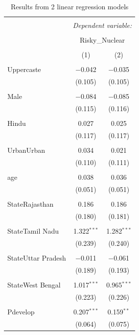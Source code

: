 \documentclass[
]{article}
\begin{document}
\begin{table}[!htbp] \centering 
  \caption{Results from 2 linear regression models} 
  \label{} 
\begin{tabular}{@{\extracolsep{5pt}}lcc} 
\\[-1.8ex]\hline 
\hline \\[-1.8ex] 
 & \multicolumn{2}{c}{\textit{Dependent variable:}} \\ 
\cline{2-3} 
\\[-1.8ex] & \multicolumn{2}{c}{Risky\_Nuclear} \\ 
\\[-1.8ex] & (1) & (2)\\ 
\hline \\[-1.8ex] 
 Uppercaste & $-$0.042 & $-$0.035 \\ 
  & (0.105) & (0.105) \\ 
  & & \\ 
 Male & $-$0.084 & $-$0.085 \\ 
  & (0.115) & (0.116) \\ 
  & & \\ 
 Hindu & 0.027 & 0.025 \\ 
  & (0.117) & (0.117) \\ 
  & & \\ 
 UrbanUrban & 0.034 & 0.021 \\ 
  & (0.110) & (0.111) \\ 
  & & \\ 
 age & 0.038 & 0.036 \\ 
  & (0.051) & (0.051) \\ 
  & & \\ 
 StateRajasthan & 0.186 & 0.186 \\ 
  & (0.180) & (0.181) \\ 
  & & \\ 
 StateTamil Nadu & 1.322$^{***}$ & 1.282$^{***}$ \\ 
  & (0.239) & (0.240) \\ 
  & & \\ 
 StateUttar Pradesh & $-$0.011 & $-$0.061 \\ 
  & (0.189) & (0.193) \\ 
  & & \\ 
 StateWest Bengal & 1.017$^{***}$ & 0.965$^{***}$ \\ 
  & (0.223) & (0.226) \\ 
  & & \\ 
 Pdevelop & 0.207$^{***}$ & 0.159$^{**}$ \\ 
  & (0.064) & (0.075) \\ 

\end{tabular}
\end{table}
\end{document}
